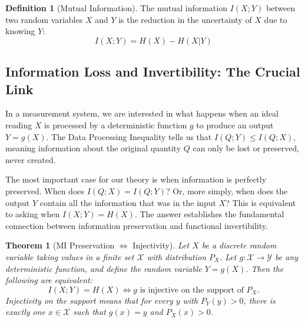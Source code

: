 \documentclass[12pt]{article}
\theoremstyle{definition}
\newtheorem{definition}{Definition}[section]
\theoremstyle{plain}
\newtheorem{theorem}{Theorem}[section]
\begin{document}
\begin{definition}[Mutual Information]
The mutual information $I(X;Y)$ between two random variables $X$ and $Y$ is the reduction in the uncertainty of $X$ due to knowing $Y$:
\[
I(X;Y) = H(X) - H(X|Y)
\]
\end{definition}

\subsection{Information Loss and Invertibility: The Crucial Link}
In a measurement system, we are interested in what happens when an ideal reading $X$ is processed by a deterministic function $g$ to produce an output $Y=g(X)$. The Data Processing Inequality tells us that $I(Q; Y) \le I(Q; X)$, meaning information about the original quantity $Q$ can only be lost or preserved, never created.

The most important case for our theory is when information is perfectly preserved. When does $I(Q;X) = I(Q;Y)$? Or, more simply, when does the output $Y$ contain all the information that was in the input $X$? This is equivalent to asking when $I(X;Y) = H(X)$. The answer establishes the fundamental connection between information preservation and functional invertibility.

\begin{theorem}[MI Preservation $\iff$ Injectivity]
\label{thm:mi_injectivity}
Let $X$ be a discrete random variable taking values in a finite set $\mathcal{X}$ with distribution $P_X$. Let $g: \mathcal{X} \to \mathcal{Y}$ be any deterministic function, and define the random variable $Y=g(X)$. Then the following are equivalent:
\[
I(X;Y) = H(X) \iff g \text{ is injective on the support of } P_X.
\]
Injectivity on the support means that for every $y$ with $P_Y(y)>0$, there is exactly one $x \in \mathcal{X}$ such that $g(x)=y$ and $P_X(x)>0$.
\end{theorem}
\end{document}
